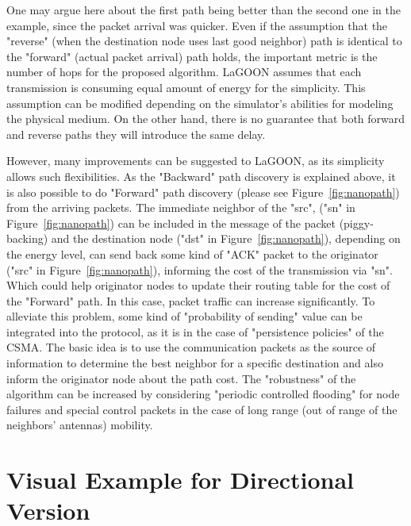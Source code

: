 \documentclass[12pt, oneandhalf, chaparabic, sees, ms]{metu}
\begin{document}
\newpage

One may argue here about the first path being better than the second one in the example, since the packet arrival was quicker. 
Even if the assumption that the "reverse" (when the destination node uses last good neighbor) path is identical to the "forward" (actual packet arrival) path holds, 
the important metric is the number of hops for the proposed algorithm. LaGOON assumes that each transmission is consuming equal amount of energy for the simplicity.
This assumption can be modified depending on the simulator's abilities for modeling the physical medium.
On the other hand, there is no guarantee that both forward and reverse paths they will introduce the same delay.

However, many improvements can be suggested to LaGOON, as its simplicity allows such flexibilities.
As the "Backward" path discovery is explained above, it is also possible to do "Forward" path discovery (please see Figure~\ref{fig:nanopath}) from the arriving packets.
The immediate neighbor of the "src", ("sn" in Figure~\ref{fig:nanopath}) can be included in the message of the packet (piggy-backing) and the destination node ("dst" in Figure~\ref{fig:nanopath}), depending on the energy level, can send back some kind of "ACK" packet to the originator ("src" in Figure~\ref{fig:nanopath}), informing the cost of the transmission via "sn". Which could help originator nodes to update their routing table for the cost of the "Forward" path.
In this case, packet traffic can increase significantly. To alleviate this problem, some kind of "probability of sending" value can be integrated into the protocol, as it is in the case of "persistence policies" of the CSMA. The basic idea is to use the communication packets as the source of information to determine the best neighbor for a specific destination and also inform the originator node about the path cost. The "robustness" of the algorithm can be increased by considering "periodic controlled flooding" for node failures and special control packets in the case of long range (out of range of the neighbors' antennas) mobility.






\newpage
\section{Visual Example for Directional Version}\label{svisexdir}
\end{document}

